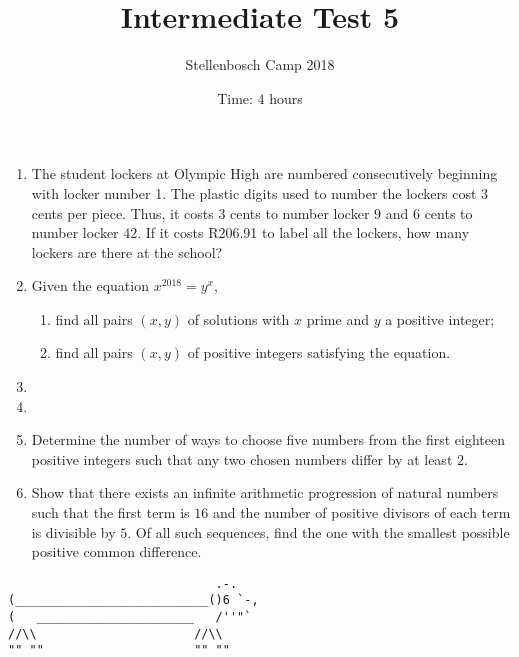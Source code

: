 \documentclass{article}
\title{Intermediate Test 5}
\author{Stellenbosch Camp 2018}
\date{Time: $4$ hours}
\begin{document}
 \maketitle

\begin{enumerate}[1.]

\item %
The student lockers at Olympic High are numbered consecutively beginning with locker number 1. The plastic digits used to number the lockers cost $3$ cents per piece. Thus, it costs $3$ cents to number locker $9$ and $6$ cents to number locker $42$. If it costs R206.91 to label all the lockers, how many lockers are there at the school?


\vspace{6pt}
\item %
Given the equation $x^{2018} = y^x$,
\begin{enumerate}
  \item find all pairs $(x,y)$ of solutions with $x$ prime and $y$ a positive integer;
  \item find all pairs $(x,y)$ of positive integers satisfying the equation.
\end{enumerate}


\vspace{6pt}
\item %


\vspace{6pt}
\item %


\vspace{6pt}
\item %
Determine the number of ways to choose five numbers from the first eighteen positive integers such that any two chosen numbers differ by at least $2$.


\vspace{6pt}
\item %
Show that there exists an infinite arithmetic progression of natural numbers such that the first term is $16$ and the number of positive divisors of each term is divisible by $5$. Of all such sequences, find the one with the smallest possible positive common difference.


\end{enumerate}


\vfill
\centering
\begin{BVerbatim}
                             .-.
(___________________________()6 `-,
(   ______________________   /''"`
//\\                      //\\
"" ""                     "" ""
\end{BVerbatim}
\end{document}
